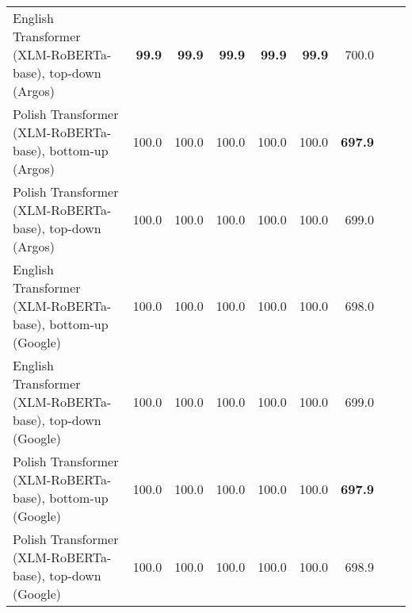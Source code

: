 \begin{table}[ht!]
{\begin{tabular}{lrrrrrrrr}
  English Transformer (XLM-RoBERTa-base), top-down (Argos) & \textbf{99.9} & \textbf{99.9} & \textbf{99.9} & \textbf{99.9} & \textbf{99.9} & 700.0 \\ 
  Polish Transformer (XLM-RoBERTa-base), bottom-up (Argos) & 100.0 & 100.0 & 100.0 & 100.0 & 100.0 & \textbf{697.9} \\ 
  Polish Transformer (XLM-RoBERTa-base), top-down (Argos) & 100.0 & 100.0 & 100.0 & 100.0 & 100.0 & 699.0 \\ 
  English Transformer (XLM-RoBERTa-base), bottom-up (Google) & 100.0 & 100.0 & 100.0 & 100.0 & 100.0 & 698.0 \\ 
  English Transformer (XLM-RoBERTa-base), top-down (Google) & 100.0 & 100.0 & 100.0 & 100.0 & 100.0 & 699.0 \\ 
  Polish Transformer (XLM-RoBERTa-base), bottom-up (Google) & 100.0 & 100.0 & 100.0 & 100.0 & 100.0 & \textbf{697.9} \\ 
  Polish Transformer (XLM-RoBERTa-base), top-down (Google) & 100.0 & 100.0 & 100.0 & 100.0 & 100.0 & 698.9 \\ 
   \hline
\end{tabular}
}
\end{table}




